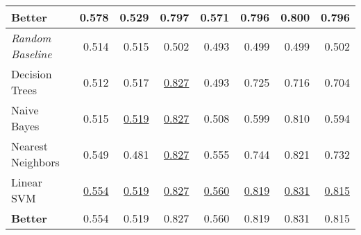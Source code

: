 \documentclass[runningheads]{llncs}
\begin{document}
\begin{table*}[t]
\begin{tabular}{lrrrrrrr}
		\textbf{Better}   & 0.578 & 0.529 & 0.797 & 0.571 & 0.796 & 0.800 & 0.796 \\    \bottomrule
		\textit{Random Baseline}   & 0.514 & 0.515 & 0.502 & 0.493 & 0.499 & 0.499 & 0.502 \\
		Decision Trees    & 0.512 & 0.517 & \underline{0.827} & 0.493 & 0.725 & 0.716 & 0.704 \\
		Naive Bayes       & 0.515 & \underline{0.519} & \underline{0.827} & 0.508 & 0.599 & 0.810  & 0.594 \\
		Nearest Neighbors & 0.549 & 0.481 & \underline{0.827} & 0.555 & 0.744 & 0.821 & 0.732 \\
		Linear SVM        & \underline{0.554} & \underline{0.519} & \underline{0.827} & \underline{0.560} & \underline{0.819} & \underline{0.831} & \underline{0.815} \\    \midrule
		\textbf{Better}   & 0.554 & 0.519 & 0.827 & 0.560 & 0.819 & 0.831 & 0.815 \\    \bottomrule
	\end{tabular}
\end{table*}
\end{document}
